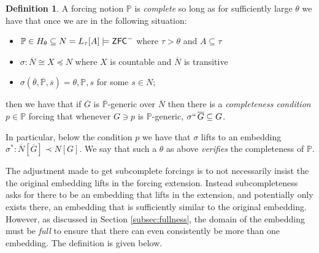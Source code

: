 \documentclass{amsart}
\theoremstyle{definition}
\newtheorem{definition}[theorem]{Definition}
\theoremstyle{remark}
\renewcommand{\P}{\mathbb{P}}
\newcommand{\N}{{\overline{N}}}
\newcommand{\G}{\overline{G}}
\newcommand{\ZFC}{\textup{\ensuremath{\textsf{ZFC}}}}
\begin{document}
\begin{definition} A forcing notion $\P$ is \emph{complete} so long as
for sufficiently large $\theta$ we have that once we are in the following situation: \begin{itemize}
	\item $\P \in H_\theta \subseteq N = L_\tau[A] \models \ZFC^-$ where $\tau>\theta$ and $A \subseteq \tau$
	\item $\sigma: \N \cong X \preccurlyeq N$ where $X$ is countable and $\N$ is transitive
	\item $\sigma(\overline \theta, \overline{\P}, \overline s)=\theta, \P, s$ for some $s \in N$;
\end{itemize}
then we have that if $\G$ is $\overline{\P}$-generic over $\N$ then there is a \emph{completeness condition} $p \in \P$ forcing that whenever $G \ni p$ is $\P$-generic, $\sigma ``\, \G \subseteq G$. 

In particular, below the condition $p$ we have that $\sigma$ lifts to an embedding $\sigma^*:\N[\G] \prec N[G]$.
We say that such a $\theta$ as above \emph{verifies} the completeness of $\P$.
\end{definition}
The adjustment made to get subcomplete forcings is to not necessarily insist the the original embedding lifts in the forcing extension. Instead subcompleteness asks for there to be an embedding that lifts in the extension, and potentially only exists there, an embedding that is sufficiently similar to the original embedding. However, as discussed in Section \ref{subsec:fullness}, the domain of the embedding must be \emph{full} to ensure that there can even consistently be more than one embedding. The definition is given below.
\end{document}
